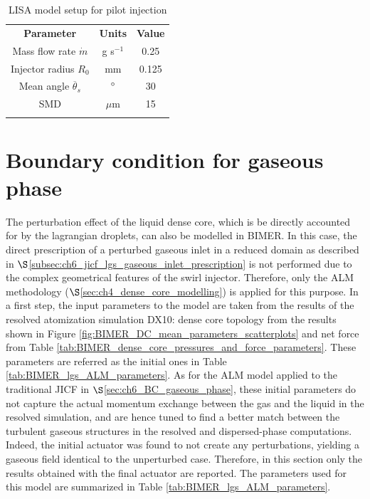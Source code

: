 

\begin{table}[!h]
\centering
\caption{LISA model setup for pilot injection}
\begin{tabular}{ccc}
\thickhline
\textbf{Parameter} & \textbf{Units} &  \textbf{Value} \\
\thickhline
Mass flow rate $\dot{m}$ & g s$^{-1}$ & 0.25 \\
Injector radius $R_0$ & mm & 0.125 \\
Mean angle $\overline{\theta}_s$ & $\degree$ & 30  \\
SMD & $\mu$m & 15 \\
\thickhline
\end{tabular}
\label{tab:LISA_model_parameters}
\end{table}




\section{Boundary condition for gaseous phase}
\label{sec:ch9_BIMER_BCs_for_gaseous_phase}

The perturbation effect of the liquid dense core, which is be directly accounted for by the lagrangian droplets, can also be modelled in BIMER. In this case, the direct prescription of a perturbed gaseous inlet in a reduced domain as described in $\S$\ref{subsec:ch6_jicf_lgs_gaseous_inlet_prescription} is not performed due to the complex geometrical features of the swirl injector. Therefore, only the ALM methodology ($\S$\ref{sec:ch4_dense_core_modelling}) is applied for this purpose. In a first step, the input parameters to the model are taken from the results of the resolved atomization simulation DX10: dense core topology from the results shown in Figure \ref{fig:BIMER_DC_mean_parameters_scatterplots} and net force from Table \ref{tab:BIMER_dense_core_pressures_and_force_parameters}.  These parameters are referred as the initial ones in Table \ref{tab:BIMER_lgs_ALM_parameters}. As for the ALM model applied to the traditional JICF in $\S$\ref{sec:ch6_BC_gaseous_phase}, these initial parameters do not capture the actual momentum exchange between the gas and the liquid in the resolved simulation, and are hence tuned to find a better match between the turbulent gaseous structures in the resolved and dispersed-phase computations. Indeed, the initial actuator was found to not create any perturbations, yielding a gaseous field identical to the unperturbed case. Therefore, in this section only the results obtained with the final actuator are reported. The parameters used for this model are summarized in Table \ref{tab:BIMER_lgs_ALM_parameters}. 

